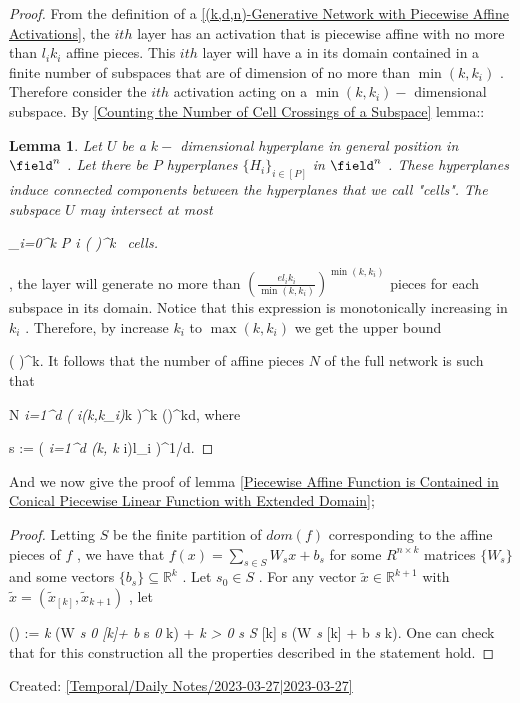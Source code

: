 \documentclass{article}
\newtheorem{lemma}[theorem]{Lemma}
\begin{document}
\begin{proof}
From the definition of a \autoref{(k,d,n)-Generative Network with Piecewise Affine Activations},  the  $ith$  layer has an activation that is piecewise affine with no more than  $l_i k_i$  affine pieces. This  $ith$  layer will have a in its domain contained in a finite number of subspaces that are of dimension of no more than  $\min(k,k_i)$ . Therefore consider the  $ith$  activation acting on a  $\min(k,k_i)-$ dimensional subspace. By
\autoref{Counting the Number of Cell Crossings of a Subspace} lemma::
\begin{lemma}
Let  $U$  be a  $k-$ dimensional hyperplane in general position in  $\field^n$ . Let there be  $P$  hyperplanes  $\{ H_i \}_{i \in [P]}$  in  $\field^n$ . These hyperplanes induce connected components between the hyperplanes that we call "cells". The subspace  $U$  may intersect at most

\sum_{i=0}^k {P \choose i} \leq \left(  \right)^k    \ 
   cells.

\end{lemma}
 , the layer will generate no more than  $\left( \frac{el_i k_i}{\min(k, k_i)} \right)^{\min(k,k_i)}$   pieces for each subspace in its domain. Notice that this expression is monotonically increasing in  $k_i$ . Therefore, by increase  $k_i$  to  $\max(k,k_i)$  we get the upper bound

\left(   \right)^{k}.  
It follows that the number of affine pieces  $N$  of the full network is such that

N \leq \prod \textit{{i=1}^d \left(  i\max(k,k_i)}{k} \right)^k \leq \left(\right)^{kd},  
where

s := \left( \prod \textit{{i=1}^d \max(k, k} i)l_i \right)^{1/d}.  

\end{proof}
And we now give the proof of lemma \autoref{Piecewise Affine Function is Contained in Conical Piecewise Linear Function with Extended Domain};
\begin{proof}
Letting  $S$  be the finite partition of  $dom(f)$  corresponding to the affine pieces of  $f$ , we have that  $f(x) = \sum_{s \in S} W_s x + b_s$  for some  $R^{n \times k}$  matrices  $\{ W_s \}$  and some vectors  $\{ b_s \}\subseteq \mathbb{R}^k$ . Let  $s_0 \in S$ . For any vector  $\tilde{x} \in \mathbb{R}^{k+1}$  with  $\tilde{x} = (\tilde{x}_{[k]}, \tilde{x}_{k+1})$ , let

() := \indicator \textit{{} k } (W \textit{{s} 0}  \textit{[k]+ b} {s \textit{0}} k) + \indicator \textit{{} k > 0} \sum \textit{{s \in S} \indicator} { {[k]} \in s} (W \textit{s } [k] + b \textit{s } k).  
One can check that for this construction all the properties described in the statement hold.

\end{proof}
Created: \autoref{Temporal/Daily Notes/2023-03-27|2023-03-27}
\printbibliography
\end{document}
